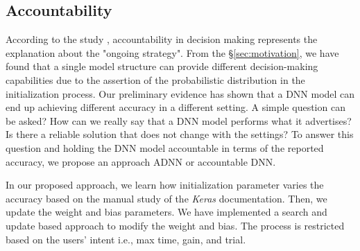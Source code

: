 \subsection{Accountability}
According to the study \cite{veale2018fairness}, accountability in decision making represents the explanation about the "ongoing strategy". From the \S\ref{sec:motivation}, we have found that a single model structure can provide different decision-making capabilities due to the assertion of the probabilistic distribution in the initialization process. Our preliminary evidence has shown that a DNN model can end up achieving different accuracy in a different setting. A simple question can be asked? How can we really say that a DNN model performs what it advertises? Is there a reliable solution that does not change with the settings?
To answer this question and holding the DNN model accountable in terms of the reported accuracy, we propose an approach ADNN or accountable DNN.

In our proposed approach, we learn how initialization parameter varies the accuracy based on the manual study of the \emph{Keras} documentation. Then, we update the weight and bias parameters. We have implemented a search and update based approach to modify the weight and bias. The process is restricted based on the users’ intent i.e., max time, gain, and trial.


